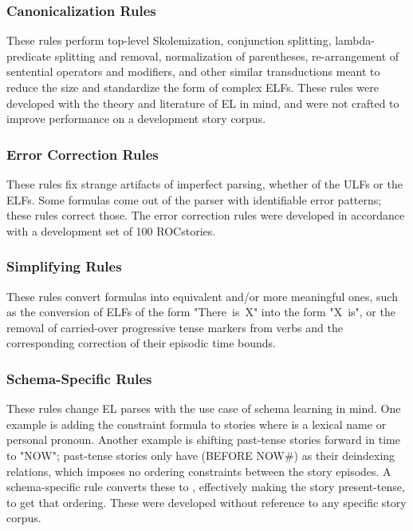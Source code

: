 \subsubsection{Canonicalization Rules}
These rules perform top-level Skolemization, conjunction splitting, lambda-predicate splitting and removal, normalization of parentheses, re-arrangement of sentential operators and modifiers, and other similar transductions meant to reduce the size and standardize the form of complex ELFs. These rules were developed with the theory and literature of EL in mind, and were not crafted to improve performance on a development story corpus.

\subsubsection{Error Correction Rules}
These rules fix strange artifacts of imperfect parsing, whether of the ULFs or the ELFs. Some formulas come out of the parser with identifiable error patterns; these rules correct those. The error correction rules were developed in accordance with a development set of 100 ROCstories.

\subsubsection{Simplifying Rules}
These rules convert formulas into equivalent and/or more meaningful ones, such as the conversion of ELFs of the form "There~is~X" into the form "X~is", or the removal of carried-over progressive tense markers from verbs and the corresponding correction of their episodic time bounds.

\subsubsection{Schema-Specific Rules}
These rules change EL parses with the use case of schema learning in mind. One example is adding the constraint formula  to stories where  is a lexical name or personal pronoun. Another example is shifting past-tense stories forward in time to "NOW"; past-tense stories only have (BEFORE NOW\#) as their deindexing relations, which imposes no ordering constraints between the story episodes. A schema-specific rule converts these to , effectively making the story present-tense, to get that ordering. These were developed without reference to any specific story corpus.

